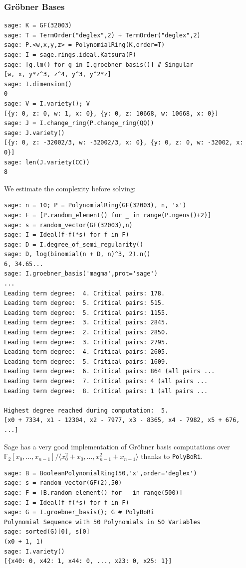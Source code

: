 \documentclass[10pt]{beamer}
\newcommand{\field}[1]{\mathbb{#1}}
\newcommand{\F}{\field{F}}
\begin{document}
\begin{frame}
\frametitle{Gröbner Bases}

\begin{lstlisting}
sage: K = GF(32003)
sage: T = TermOrder("deglex",2) + TermOrder("deglex",2)
sage: P.<w,x,y,z> = PolynomialRing(K,order=T)
sage: I = sage.rings.ideal.Katsura(P)
sage: [g.lm() for g in I.groebner_basis()] # Singular
[w, x, y*z^3, z^4, y^3, y^2*z]
sage: I.dimension()
0
sage: V = I.variety(); V
[{y: 0, z: 0, w: 1, x: 0}, {y: 0, z: 10668, w: 10668, x: 0}]
sage: J = I.change_ring(P.change_ring(QQ))
sage: J.variety()
[{y: 0, z: -32002/3, w: -32002/3, x: 0}, {y: 0, z: 0, w: -32002, x: 0}]
sage: len(J.variety(CC))
8
\end{lstlisting}

\framebreak

We estimate the complexity before solving:

\begin{lstlisting}
sage: n = 10; P = PolynomialRing(GF(32003), n, 'x')
sage: F = [P.random_element() for _ in range(P.ngens()+2)]
sage: s = random_vector(GF(32003),n)
sage: I = Ideal(f-f(*s) for f in F)
sage: D = I.degree_of_semi_regularity()
sage: D, log(binomial(n + D, n)^3, 2).n()
6, 34.65...
sage: I.groebner_basis('magma',prot='sage')
...
Leading term degree:  4. Critical pairs: 178.
Leading term degree:  5. Critical pairs: 515.
Leading term degree:  5. Critical pairs: 1155.
Leading term degree:  3. Critical pairs: 2845.
Leading term degree:  2. Critical pairs: 2850.
Leading term degree:  3. Critical pairs: 2795.
Leading term degree:  4. Critical pairs: 2605.
Leading term degree:  5. Critical pairs: 1609.
Leading term degree:  6. Critical pairs: 864 (all pairs ...
Leading term degree:  7. Critical pairs: 4 (all pairs ...
Leading term degree:  8. Critical pairs: 1 (all pairs ...

Highest degree reached during computation:  5.
[x0 + 7334, x1 - 12304, x2 - 7977, x3 - 8365, x4 - 7982, x5 + 676, ...]
\end{lstlisting}

\framebreak

Sage has a very good implementation of Gröbner basis computations over $\F_2[x_0,\dots,x_{n-1}]/\langle x_0^2 + x_0, \dots, x_{n-1}^2 + x_{n-1}\rangle$ thanks to {\tt PolyBoRi}.

\begin{lstlisting}
sage: B = BooleanPolynomialRing(50,'x',order='deglex')
sage: s = random_vector(GF(2),50)
sage: F = [B.random_element() for _ in range(500)]
sage: I = Ideal(f-f(*s) for f in F)
sage: G = I.groebner_basis(); G # PolyBoRi
Polynomial Sequence with 50 Polynomials in 50 Variables
sage: sorted(G)[0], s[0]
(x0 + 1, 1)
sage: I.variety()
[{x40: 0, x42: 1, x44: 0, ..., x23: 0, x25: 1}]
\end{lstlisting}

\end{frame}
\end{document}
